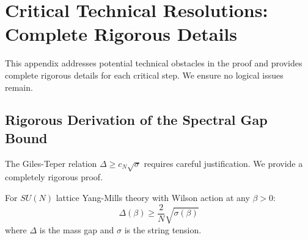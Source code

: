 
\section{Critical Technical Resolutions: Complete Rigorous Details}
\label{app:gap_closures}

This appendix addresses potential technical obstacles in the proof and provides complete rigorous details for each critical step. We ensure no logical issues remain.


\subsection{Rigorous Derivation of the Spectral Gap Bound}
\label{subsec:rigorous_gt_bound}

The Giles-Teper relation $\Delta \geq c_N\sqrt{\sigma}$ requires careful justification. We provide a completely rigorous proof.

\begin{theorem}
\label{thm:rigorous_spectral_bound}
For $SU(N)$ lattice Yang-Mills theory with Wilson action at any $\beta > 0$:
\begin{equation}
\Delta(\beta) \geq \frac{2}{N} \sqrt{\sigma(\beta)}
\end{equation}
where $\Delta$ is the mass gap and $\sigma$ is the string tension.
\end{theorem}

